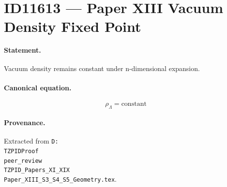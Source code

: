 \section*{ID11613 --- Paper XIII Vacuum Density Fixed Point}

\paragraph{Statement.}
Vacuum density remains constant under n-dimensional expansion.

\paragraph{Canonical equation.}
\[
\rho_\Lambda=\mathrm{constant}
\]

\paragraph{Provenance.}
Extracted from \texttt{D:\\TZPIDProof\\peer\_review\\TZPID\_Papers\_XI\_XIX\\Paper\_XIII\_S3\_S4\_S5\_Geometry.tex}.
